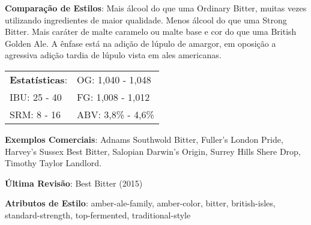 \textbf{Comparação de Estilos}: Mais álcool do que uma Ordinary Bitter, muitas vezes utilizando ingredientes de maior qualidade. Menos álcool do que uma Strong Bitter. Mais caráter de malte caramelo ou malte base e cor do que uma British Golden Ale. A ênfase está na adição de lúpulo de amargor, em oposição a agressiva adição tardia de lúpulo vista em ales americanas.

\begin{tabular}{@{}p{35mm}p{35mm}@{}}
  \textbf{Estatísticas}: & OG: 1,040 - 1,048 \\
  IBU: 25 - 40  & FG: 1,008 - 1,012  \\
  SRM: 8 - 16  & ABV: 3,8\% - 4,6\%
\end{tabular}

\textbf{Exemplos Comerciais}: Adnams Southwold Bitter, Fuller's London Pride, Harvey's Sussex Best Bitter, Salopian Darwin’s Origin, Surrey Hills Shere Drop, Timothy Taylor Landlord.

\textbf{Última Revisão}: Best Bitter (2015)

\textbf{Atributos de Estilo}: amber-ale-family, amber-color, bitter, british-isles, standard-strength, top-fermented, traditional-style
